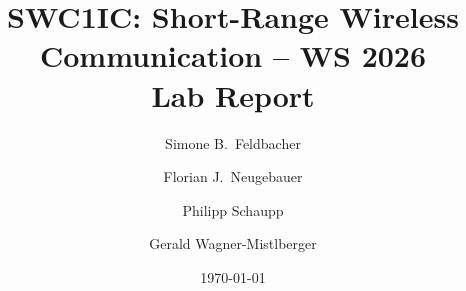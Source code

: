 \documentclass[language=english,titlepage=false,smartquotes=true]{hgbreport}
\begin{document}

\author{Simone B.\ Feldbacher \and
		Florian J.\ Neugebauer \and
		Philipp Schaupp \and
		Gerald Wagner-Mistlberger}
\title{SWC1IC: Short-Range Wireless Communication  -- WS 2026\\ %
				Lab Report }
\date{\today}

\maketitle



\end{document}
